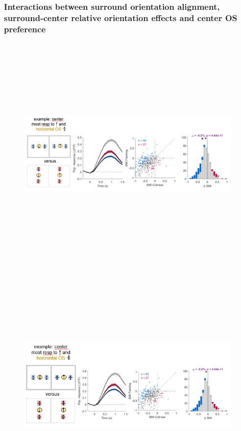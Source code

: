 \subsubsection{Interactions between surround orientation alignment, surround-center relative orientation effects and center OS preference}

\begin{figure}[H] \centering \includegraphics[width=12cm,height=12cm,keepaspectratio]{Figures/7.Results/finalPopulation/sel/diagrams/12.png} 
\end{figure}

\begin{figure}[H] \centering \includegraphics[width=12cm,height=12cm,keepaspectratio]{Figures/7.Results/finalPopulation/sel/diagrams/13.png} 
\end{figure}


